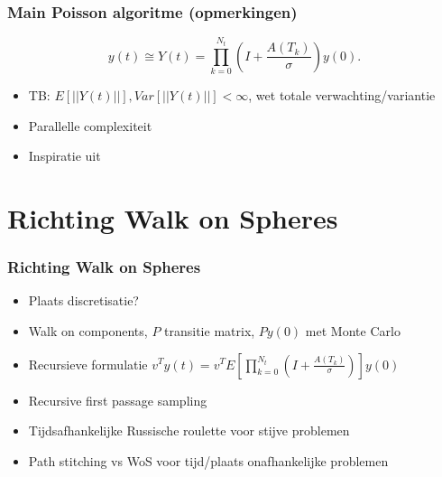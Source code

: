 \documentclass[18pt,aspectratio=149]{beamer}
\begin{document}

\begin{frame}
    \frametitle{Main Poisson algoritme (opmerkingen)}
    \begin{equation}
        y(t) \cong Y(t) =  \prod_{k=0}^{N_{t}}\left(I + \frac{A(T_{k})}{\sigma} \right)    y(0).
    \end{equation}
    \begin{itemize}
        \item TB: $E[||Y(t)||],Var[||Y(t)||]< \infty$, wet totale verwachting/variantie
        \item Parallelle complexiteit
        \item Inspiratie uit \cite{acebron_monte_2016}
    \end{itemize}
\end{frame}

\section{Richting Walk on Spheres}

\begin{frame}
    \tableofcontentscurrent
\end{frame}


\begin{frame}
    \frametitle{Richting Walk on Spheres}
    \begin{itemize}
        \item<+->{Plaats discretisatie?}
        \item<+->{Walk on components, $P$ transitie matrix, $Py(0)$ met Monte Carlo}
        \item<+->{Recursieve formulatie $v^{T}y(t)= v^{T}E \left[\prod_{k=0}^{N_{t}}\left(I + \frac{A(T_{k})}{\sigma} \right) \right] y(0) $}
        \item<+->{Recursive first passage sampling}
        \item<+->{Tijdsafhankelijke Russische roulette voor stijve problemen}
        \item<+->{Path stitching vs WoS voor tijd/plaats onafhankelijke problemen}
    \end{itemize}

\end{frame}
\end{document}

